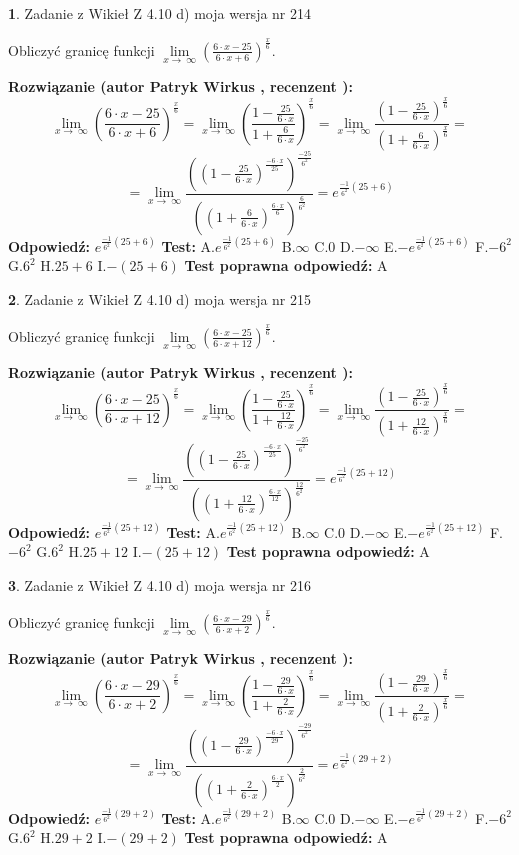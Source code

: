 \documentclass[12pt, a4paper]{article}
\theoremstyle{definition} %
\newtheorem{zad}{}
\newcommand{\zadStart}[1]{\begin{zad}#1\newline}
\newcommand{\zadStop}{\end{zad}}
\newcommand{\rozwStart}[2]{\noindent \textbf{Rozwiązanie (autor #1 , recenzent #2): }\newline}
\newcommand{\rozwStop}{\newline}
\newcommand{\odpStart}{\noindent \textbf{Odpowiedź:}\newline}
\newcommand{\odpStop}{\newline}
\newcommand{\testStart}{\noindent \textbf{Test:}\newline}
\newcommand{\testStop}{\newline}
\newcommand{\kluczStart}{\noindent \textbf{Test poprawna odpowiedź:}\newline}
\newcommand{\kluczStop}{\newline}
\begin{document}
\zadStart{Zadanie z Wikieł Z 4.10 d) moja wersja nr 214}


Obliczyć granicę funkcji  $\lim\limits_{x\to\ \infty}(\frac{6\cdot x-25}{6\cdot x+6})^{\frac{x}{6}}$.
\zadStop
\rozwStart{Patryk Wirkus}{}
$$\lim\limits_{x\to\ \infty}(\frac{6\cdot x-25}{6\cdot x+6})^{\frac{x}{6}} = \lim\limits_{x\to\ \infty}(\frac{1-\frac{25}{6\cdot x}}{1+\frac{6}{6\cdot x}})^{\frac{x}{6}}=\lim\limits_{x\to\ \infty}\frac{(1-\frac{25}{6\cdot x})^{\frac{x}{6}}}{(1+\frac{6}{6\cdot x})^{\frac{x}{6}}}=$$
$$=\lim\limits_{x\to\ \infty}\frac{((1-\frac{25}{6\cdot x})^{\frac{-6\cdot x}{25}})^{\frac{-25}{6^{2}}}}{((1+\frac{6}{6\cdot x})^{\frac{6\cdot x}{6}})^{\frac{6}{6^{2}}}}=e^{\frac{-1}{6^{2}}(25+6)}$$
\rozwStop
\odpStart
$e^{\frac{-1}{6^{2}}(25+6)}$
\odpStop
\testStart
A.$e^{\frac{-1}{6^{2}}(25+6)}$ B.$\infty$ C.$0$ D.$-\infty$ E.$-e^{\frac{-1}{6^{2}}(25+6)}$
F.$-6^{2}$ G.$6^{2}$
H.$25+6$
I.$-(25+6)$
\testStop
\kluczStart
A
\kluczStop



\zadStart{Zadanie z Wikieł Z 4.10 d) moja wersja nr 215}


Obliczyć granicę funkcji  $\lim\limits_{x\to\ \infty}(\frac{6\cdot x-25}{6\cdot x+12})^{\frac{x}{6}}$.
\zadStop
\rozwStart{Patryk Wirkus}{}
$$\lim\limits_{x\to\ \infty}(\frac{6\cdot x-25}{6\cdot x+12})^{\frac{x}{6}} = \lim\limits_{x\to\ \infty}(\frac{1-\frac{25}{6\cdot x}}{1+\frac{12}{6\cdot x}})^{\frac{x}{6}}=\lim\limits_{x\to\ \infty}\frac{(1-\frac{25}{6\cdot x})^{\frac{x}{6}}}{(1+\frac{12}{6\cdot x})^{\frac{x}{6}}}=$$
$$=\lim\limits_{x\to\ \infty}\frac{((1-\frac{25}{6\cdot x})^{\frac{-6\cdot x}{25}})^{\frac{-25}{6^{2}}}}{((1+\frac{12}{6\cdot x})^{\frac{6\cdot x}{12}})^{\frac{12}{6^{2}}}}=e^{\frac{-1}{6^{2}}(25+12)}$$
\rozwStop
\odpStart
$e^{\frac{-1}{6^{2}}(25+12)}$
\odpStop
\testStart
A.$e^{\frac{-1}{6^{2}}(25+12)}$ B.$\infty$ C.$0$ D.$-\infty$ E.$-e^{\frac{-1}{6^{2}}(25+12)}$
F.$-6^{2}$ G.$6^{2}$
H.$25+12$
I.$-(25+12)$
\testStop
\kluczStart
A
\kluczStop



\zadStart{Zadanie z Wikieł Z 4.10 d) moja wersja nr 216}


Obliczyć granicę funkcji  $\lim\limits_{x\to\ \infty}(\frac{6\cdot x-29}{6\cdot x+2})^{\frac{x}{6}}$.
\zadStop
\rozwStart{Patryk Wirkus}{}
$$\lim\limits_{x\to\ \infty}(\frac{6\cdot x-29}{6\cdot x+2})^{\frac{x}{6}} = \lim\limits_{x\to\ \infty}(\frac{1-\frac{29}{6\cdot x}}{1+\frac{2}{6\cdot x}})^{\frac{x}{6}}=\lim\limits_{x\to\ \infty}\frac{(1-\frac{29}{6\cdot x})^{\frac{x}{6}}}{(1+\frac{2}{6\cdot x})^{\frac{x}{6}}}=$$
$$=\lim\limits_{x\to\ \infty}\frac{((1-\frac{29}{6\cdot x})^{\frac{-6\cdot x}{29}})^{\frac{-29}{6^{2}}}}{((1+\frac{2}{6\cdot x})^{\frac{6\cdot x}{2}})^{\frac{2}{6^{2}}}}=e^{\frac{-1}{6^{2}}(29+2)}$$
\rozwStop
\odpStart
$e^{\frac{-1}{6^{2}}(29+2)}$
\odpStop
\testStart
A.$e^{\frac{-1}{6^{2}}(29+2)}$ B.$\infty$ C.$0$ D.$-\infty$ E.$-e^{\frac{-1}{6^{2}}(29+2)}$
F.$-6^{2}$ G.$6^{2}$
H.$29+2$
I.$-(29+2)$
\testStop
\kluczStart
A
\kluczStop
\end{document}

